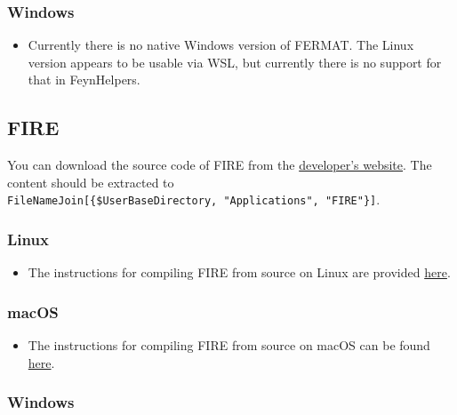 \documentclass[../FeynHelpersManual.tex]{subfiles}
\begin{document}
\hypertarget{windows}{%
\subsubsection{Windows}\label{windows}}

\begin{itemize}
\tightlist
\item
  Currently there is no native Windows version of FERMAT. The Linux
  version appears to be usable via WSL, but currently there is no
  support for that in FeynHelpers.
\end{itemize}

\hypertarget{fire}{%
\subsection{FIRE}\label{fire}}

You can download the source code of FIRE from the
\href{https://bitbucket.org/feynmanIntegrals/fire}{developer's website}.
The content should be extracted to
\texttt{FileNameJoin[\allowbreak{}\{\allowbreak{}\$UserBaseDirectory,\ \allowbreak{}"Applications",\ \allowbreak{}"FIRE"\}]}.

\hypertarget{linux-1}{%
\subsubsection{Linux}\label{linux-1}}

\begin{itemize}
\tightlist
\item
  The instructions for compiling FIRE from source on Linux are provided
  \href{https://bitbucket.org/feynmanIntegrals/fire/src/master/README.md}{here}.
\end{itemize}

\hypertarget{macos-1}{%
\subsubsection{macOS}\label{macos-1}}

\begin{itemize}
\tightlist
\item
  The instructions for compiling FIRE from source on macOS can be found
  \href{https://bitbucket.org/feynmanIntegrals/fire/issues/10/issue-of-the-installation-on-macos}{here}.
\end{itemize}

\hypertarget{windows-1}{%
\subsubsection{Windows}\label{windows-1}}
\end{document}
